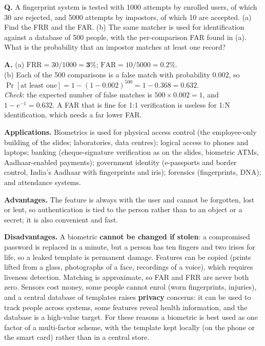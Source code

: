 \begin{worked}
\textbf{Q.} A fingerprint system is tested with 1000 attempts by enrolled users, of which 30 are rejected, and 5000 attempts by impostors, of which 10 are accepted. (a) Find the FRR and the FAR. (b) The same matcher is used for identification against a database of 500 people, with the per-comparison FAR found in (a). What is the probability that an impostor matches at least one record?

\textbf{A.} (a) $\mathrm{FRR} = 30/1000 = \mathbf{3\%}$; \;$\mathrm{FAR} = 10/5000 = \mathbf{0.2\%}$.\\
(b) Each of the 500 comparisons is a false match with probability $0.002$, so
$\Pr[\text{at least one}] = 1 - (1 - 0.002)^{500} = 1 - 0.368 = \mathbf{0.632}$.\\
\emph{Check}: the expected number of false matches is $500 \times 0.002 = 1$, and $1 - e^{-1} = 0.632$. A FAR that is fine for 1:1 verification is useless for 1:N identification, which needs a far lower FAR.
\end{worked}

\textbf{Applications.} Biometrics is used for physical access control (the employee-only building of the slides; laboratories, data centres); logical access to phones and laptops; banking (cheque-signature verification as on the slides, biometric ATMs, Aadhaar-enabled payments); government identity (e-passports and border control, India's Aadhaar with fingerprints and iris); forensics (fingerprints, DNA); and attendance systems.

\textbf{Advantages.} The feature is always with the user and cannot be forgotten, lost or lent, so authentication is tied to the person rather than to an object or a secret; it is also convenient and fast.

\textbf{Disadvantages.} A biometric \textbf{cannot be changed if stolen}: a compromised password is replaced in a minute, but a person has ten fingers and two irises for life, so a leaked template is permanent damage. Features can be copied (prints lifted from a glass, photographs of a face, recordings of a voice), which requires liveness detection. Matching is approximate, so FAR and FRR are never both zero. Sensors cost money, some people cannot enrol (worn fingerprints, injuries), and a central database of templates raises \textbf{privacy} concerns: it can be used to track people across systems, some features reveal health information, and the database is a high-value target. For these reasons a biometric is best used as one factor of a multi-factor scheme, with the template kept locally (on the phone or the smart card) rather than in a central store.


